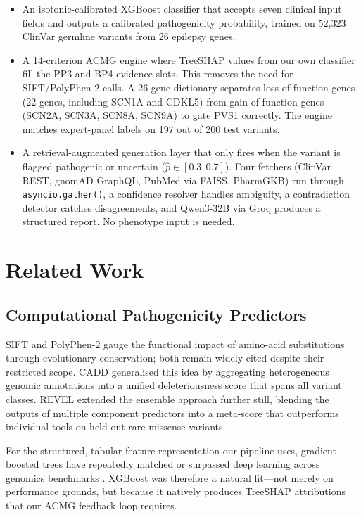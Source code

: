 \documentclass[12pt,a4paper]{article}
\begin{document}
\begin{itemize}
  \item An isotonic-calibrated XGBoost classifier that accepts
        seven clinical input fields and outputs a calibrated
        pathogenicity probability, trained on 52,323 ClinVar
        germline variants from 26 epilepsy genes.
  \item A 14-criterion ACMG engine where TreeSHAP values from
        our own classifier fill the PP3 and BP4 evidence slots.
        This removes the need for SIFT/PolyPhen-2 calls. A
        26-gene dictionary separates loss-of-function genes
        (22 genes, including SCN1A and CDKL5) from
        gain-of-function genes (SCN2A, SCN3A, SCN8A, SCN9A) to gate
        PVS1 correctly. The engine matches expert-panel labels
        on 197 out of 200 test variants.
  \item A retrieval-augmented generation layer that only fires
        when the variant is flagged pathogenic or uncertain
        ($\hat{p}\!\in\![0.3,0.7]$). Four fetchers (ClinVar
        REST, gnomAD GraphQL, PubMed via FAISS, PharmGKB) run
        through \texttt{asyncio.gather()}, a confidence resolver
        handles ambiguity, a contradiction detector catches
        disagreements, and Qwen3-32B via Groq produces a
        structured report. No phenotype input is needed.
\end{itemize}

\section{Related Work}

\subsection{Computational Pathogenicity Predictors}

SIFT and PolyPhen-2 gauge the functional impact of amino-acid
substitutions through evolutionary conservation; both remain
widely cited despite their restricted scope. CADD \citep{cadd2014}
generalised this idea by aggregating heterogeneous genomic
annotations into a unified deleteriousness score that spans all
variant classes. REVEL \citep{revel2016} extended the ensemble
approach further still, blending the outputs of multiple component
predictors into a meta-score that outperforms individual tools
on held-out rare missense variants.

For the structured, tabular feature representation our pipeline
uses, gradient-boosted trees have repeatedly matched or surpassed
deep learning across genomics benchmarks \citep{parente2021}.
XGBoost \citep{chen2016xgboost} was therefore a natural fit---not
merely on performance grounds, but because it natively produces
TreeSHAP attributions that our ACMG feedback loop requires.
\end{document}
